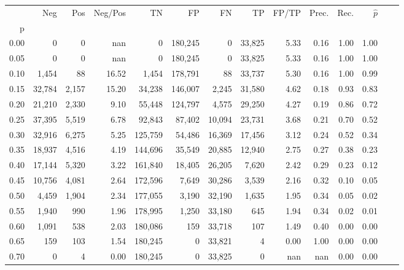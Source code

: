 \begin{tabular}{rrrrrrrrrrrrrr}
\toprule
{} &     Neg &    Pos & Neg/Pos &       TN &       FP &      FN &      TP & FP/TP & Prec. &  Rec. & $\hat{p}$ \\
p    &         &        &         &          &          &         &         &       &       &       &           \\
\midrule
0.00 &       0 &      0 &     nan &        0 &  180,245 &       0 &  33,825 &  5.33 &  0.16 &  1.00 &      1.00 \\
0.05 &       0 &      0 &     nan &        0 &  180,245 &       0 &  33,825 &  5.33 &  0.16 &  1.00 &      1.00 \\
0.10 &   1,454 &     88 &   16.52 &    1,454 &  178,791 &      88 &  33,737 &  5.30 &  0.16 &  1.00 &      0.99 \\
0.15 &  32,784 &  2,157 &   15.20 &   34,238 &  146,007 &   2,245 &  31,580 &  4.62 &  0.18 &  0.93 &      0.83 \\
0.20 &  21,210 &  2,330 &    9.10 &   55,448 &  124,797 &   4,575 &  29,250 &  4.27 &  0.19 &  0.86 &      0.72 \\
0.25 &  37,395 &  5,519 &    6.78 &   92,843 &   87,402 &  10,094 &  23,731 &  3.68 &  0.21 &  0.70 &      0.52 \\
0.30 &  32,916 &  6,275 &    5.25 &  125,759 &   54,486 &  16,369 &  17,456 &  3.12 &  0.24 &  0.52 &      0.34 \\
0.35 &  18,937 &  4,516 &    4.19 &  144,696 &   35,549 &  20,885 &  12,940 &  2.75 &  0.27 &  0.38 &      0.23 \\
0.40 &  17,144 &  5,320 &    3.22 &  161,840 &   18,405 &  26,205 &   7,620 &  2.42 &  0.29 &  0.23 &      0.12 \\
0.45 &  10,756 &  4,081 &    2.64 &  172,596 &    7,649 &  30,286 &   3,539 &  2.16 &  0.32 &  0.10 &      0.05 \\
0.50 &   4,459 &  1,904 &    2.34 &  177,055 &    3,190 &  32,190 &   1,635 &  1.95 &  0.34 &  0.05 &      0.02 \\
0.55 &   1,940 &    990 &    1.96 &  178,995 &    1,250 &  33,180 &     645 &  1.94 &  0.34 &  0.02 &      0.01 \\
0.60 &   1,091 &    538 &    2.03 &  180,086 &      159 &  33,718 &     107 &  1.49 &  0.40 &  0.00 &      0.00 \\
0.65 &     159 &    103 &    1.54 &  180,245 &        0 &  33,821 &       4 &  0.00 &  1.00 &  0.00 &      0.00 \\
0.70 &       0 &      4 &    0.00 &  180,245 &        0 &  33,825 &       0 &   nan &   nan &  0.00 &      0.00 \\

\end{tabular}
